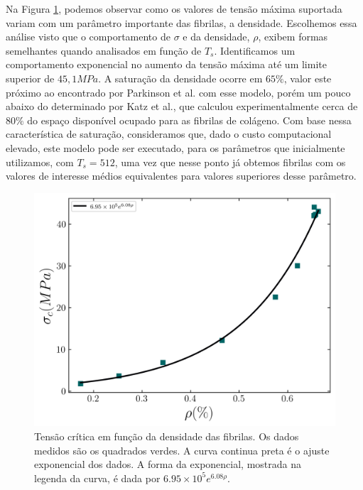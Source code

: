 \documentclass[11pt,a4paper]{article} %
\begin{document}
        
        

        Na Figura \ref{R6}, podemos observar como os valores de tensão máxima suportada variam com um parâmetro  
        importante das fibrilas, a densidade. Escolhemos essa análise visto que o comportamento de \(\sigma\) e da  
        densidade, \(\rho\), exibem formas semelhantes quando analisados em função de \(T_{s}\). Identificamos um  
        comportamento exponencial no aumento da tensão máxima até um limite superior de \(45,1 MPa\). A saturação da  
        densidade ocorre em \(65 \% \), valor este próximo ao encontrado por Parkinson et al.\cite{Parkinson1995} com esse  
        modelo, porém um pouco abaixo do determinado por Katz et al.\cite{KATZ1973351}, que calculou experimentalmente  
        cerca de \(80 \% \) do espaço disponível ocupado para as fibrilas de colágeno. Com base nessa característica de  
        saturação, consideramos que, dado o custo computacional elevado, este modelo pode ser executado, para os parâmetros  
        que inicialmente utilizamos, com \(T_{s}=512\), uma vez que nesse ponto já obtemos fibrilas com os valores de  
        interesse médios equivalentes para valores superiores desse parâmetro.  


        \begin{figure}[H] 

            \centering 
            \includegraphics[width=\textwidth]{figures/sigma_rho.png} 
            \caption{Tensão crítica em função da densidade das fibrilas. Os dados medidos são os quadrados verdes. A curva  
            continua preta é o ajuste exponencial dos dados. A forma da exponencial, mostrada na legenda da curva, é dada  
            por \(6.95 \times 10^{5}e^{6.08\rho}\).}
            \label{R6} 

        \end{figure} 
\end{document}
